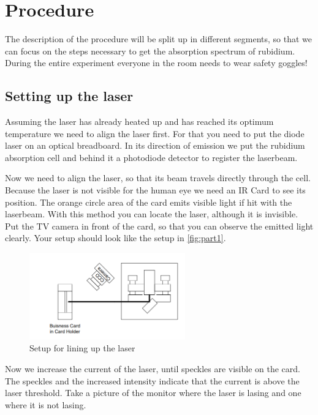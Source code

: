 \section{Procedure}
\label{sec:Procedure}

The description of the procedure will be split up in different segments, so that we can focus on the steps necessary to get the absorption spectrum of rubidium.
During the entire experiment everyone in the room needs to wear safety goggles!

\subsection{Setting up the laser}
\label{ssec:exe1}

Assuming the laser has already heated up and has reached its optimum temperature we need to align the laser first.
For that you need to put the diode laser on an optical breadboard.
In its direction of emission we put the rubidium absorption cell and behind it a photodiode detector to register the laserbeam.

Now we need to align the laser, so that its beam travels directly through the cell.
Because the laser is not visible for the human eye we need an IR Card to see its position. 
The orange circle area of the card emits visible light if hit with the laserbeam. 
With this method you can locate the laser, although it is invisible.
Put the TV camera in front of the card, so that you can observe the emitted light clearly.
Your setup should look like the setup in \autoref{fig:part1}.

\begin{figure}
    \centering
    \includegraphics[width=0.6\textwidth]{images/part1.png}
    \caption{Setup for lining up the laser \cite{V60}}
    \label{fig:part1}
\end{figure}

Now we increase the current of the laser, until speckles are visible on the card. 
The speckles and the increased intensity indicate that the current is above the laser threshold. 
Take a picture of the monitor where the laser is lasing and one where it is not lasing.

